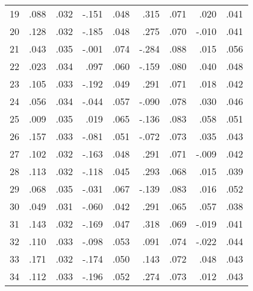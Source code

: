 \documentclass[a4paper,fleqn,usenatbib]{mnras}
\begin{document}
\begin{landscape}
\begin{table}
\begin{tabular}{|r|r|r|r|r|r|r|r|r|}
 19 & .088 & .032 & -.151 & .048 & .315 & .071 & .020 & .041\\
 20 & .128 & .032 & -.185 & .048 & .275 & .070 & -.010 & .041\\
 21 & .043 & .035 & -.001 & .074 & -.284 & .088 & .015 & .056\\
 22 & .023 & .034 & .097 & .060 & -.159 & .080 & .040 & .048\\
 23 & .105 & .033 & -.192 & .049 & .291 & .071 & .018 & .042\\
 24 & .056 & .034 & -.044 & .057 & -.090 & .078 & .030 & .046\\
 25 & .009 & .035 & .019 & .065 & -.136 & .083 & .058 & .051\\
 26 & .157 & .033 & -.081 & .051 & -.072 & .073 & .035 & .043\\
 27 & .102 & .032 & -.163 & .048 & .291 & .071 & -.009 & .042\\
 28 & .113 & .032 & -.118 & .045 & .293 & .068 & .015 & .039\\
 29 & .068 & .035 & -.031 & .067 & -.139 & .083 & .016 & .052\\
 30 & .049 & .031 & -.060 & .042 & .291 & .065 & .057 & .038\\
 31 & .143 & .032 & -.169 & .047 & .318 & .069 & -.019 & .041\\
 32 & .110 & .033 & -.098 & .053 & .091 & .074 & -.022 & .044\\
 33 & .171 & .032 & -.174 & .050 & .143 & .072 & .048 & .043\\
 34 & .112 & .033 & -.196 & .052 & .274 & .073 & .012 & .043\\
	\hline\end{tabular}

\label{tab:members_ab}
		\end{table}
	\end{landscape}
	
\end{document}
